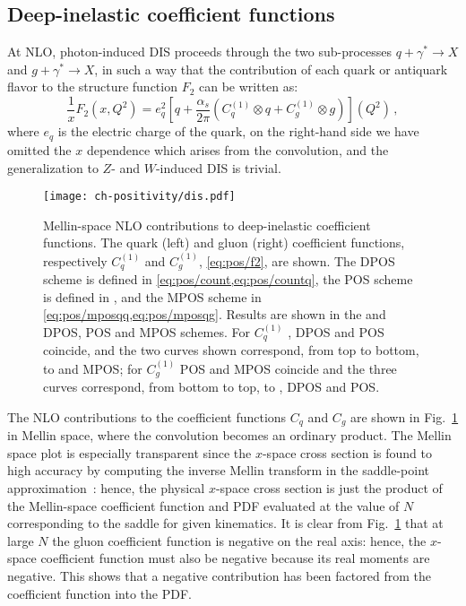 \subsection{Deep-inelastic coefficient functions}
\label{sec:discf}
At NLO, photon-induced DIS proceeds through the two
sub-processes $q+\gamma^*\to X$ and $g+\gamma^*\to X$, in such a way
that the contribution of each quark or antiquark flavor to the
structure function $F_2$ can be written as:
\begin{equation}\label{eq:pos/f2}
 \frac{1}{x} F_2(x,Q^2)= e_q^2 \left[q
 +\frac{\alpha_s}{2\pi}\left( C^{(1)}_q \otimes q+ C^{(1)}_g \otimes
 g\right)\right](Q^2)\,,
 \end{equation}
where $e_q$ is the electric charge of the quark, on the right-hand
side we have omitted the $x$ dependence which arises from the
convolution,
and the
generalization to $Z$- and $W$-induced DIS is trivial.

\begin{figure}[t]
  \begin{center}
    \texttt{[image: ch-positivity/dis.pdf]}
    \caption{\small Mellin-space NLO contributions to deep-inelastic coefficient
      functions. The quark (left) and gluon (right) coefficient
      functions, respectively $C_q^{(1)}$ and $C_g^{(1)}$, \cref{eq:pos/f2}, are
      shown. The DPOS
      scheme is defined in \cref{eq:pos/count,eq:pos/countq}, the POS
      scheme is defined in ,
      and the MPOS scheme
      in \cref{eq:pos/mposqq,eq:pos/mposqg}.
      Results are shown in the \msbar{} and DPOS, POS and MPOS
      schemes. For  $C_q^{(1)}$ \msbar{}, DPOS and POS
      coincide, and the two curves shown correspond, from top to
      bottom, to \msbar{} and MPOS; for $C_g^{(1)}$ POS and MPOS
      coincide and the three
      curves correspond,
      from  bottom to top, to \msbar{}, DPOS and POS.
    \label{fig:dis} }
  \end{center}
\end{figure}
  The
  \msbar{} NLO contributions to the coefficient functions
  $C_q$ and $C_g$ are shown in Fig.~\ref{fig:dis} in Mellin space,
  where the convolution becomes an ordinary product. The
  Mellin space plot is especially transparent since the $x$-space
  cross section is found to high accuracy by computing the inverse
  Mellin transform in the saddle-point
  approximation~\cite{Bonvini:2012an}: hence, the physical  $x$-space
  cross section is just the product of the Mellin-space coefficient
  function and PDF evaluated at the value of $N$ corresponding to the
  saddle for given kinematics. 
  It is clear  from Fig.~\ref{fig:dis} that at
  large $N$ the gluon coefficient function is negative on the real
  axis: hence, the $x$-space coefficient function must also be
  negative because its real moments are negative. This shows
 that a negative contribution has been factored from the coefficient
 function into the PDF. 


